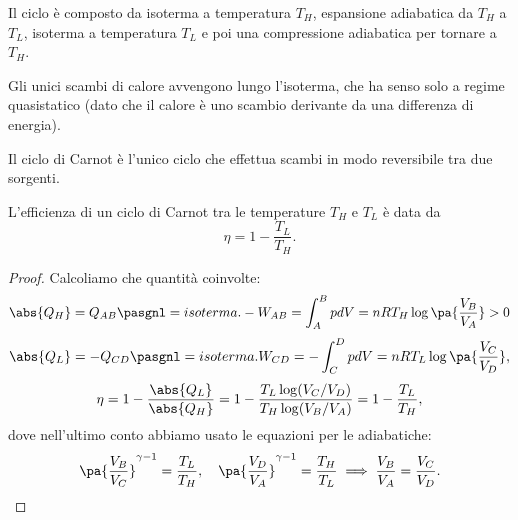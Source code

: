 \noindent
Il ciclo \`e composto da isoterma a temperatura $T_H$, espansione adiabatica da $T_H$ a $T_L$, isoterma a temperatura $T_L$ e poi una compressione adiabatica per tornare a $T_H$.

\begin{remark}
Gli unici scambi di calore avvengono lungo l'isoterma, che ha senso solo a regime quasistatico (dato che il calore \`e uno scambio derivante da una differenza di energia).
\end{remark}

\begin{fact}
Il ciclo di Carnot \`e l'unico ciclo che effettua scambi in modo reversibile tra due sorgenti.
\end{fact}




\begin{proposition}\label{EfficienzaCicloCarnot}
L'efficienza di un ciclo di Carnot tra le temperature $T_H$ e $T_L$ \`e data da
\[\eta=1-\frac{T_L}{T_H}.\]
\end{proposition}
\begin{proof}
Calcoliamo che quantit\`a coinvolte:
\[\abs{Q_H}=Q_{AB}\pasgnl={isoterma.}-W_{AB}=\int_A^BpdV=nRT_H\log\pa{\frac{V_B}{V_A}}>0\]
\[\abs{Q_L}=-Q_{CD}\pasgnl={isoterma.}W_{CD}=-\int_C^DpdV=nRT_L\log\pa{\frac{V_C}{V_D}},\]
\[\eta=1-\frac{\abs{Q_L}}{\abs{Q_H}}=1-\frac{T_L\log(V_C/V_D)}{T_H\log(V_B/V_A)}=1-\frac{T_L}{T_H},\]
dove nell'ultimo conto abbiamo usato le equazioni per le adiabatiche:
\[\pa{\frac{V_B}{V_C}}^{\gamma-1}=\frac{T_L}{T_H},\quad \pa{\frac{V_D}{V_A}}^{\gamma-1}=\frac{T_H}{T_L}\implies \frac{V_B}{V_A}=\frac{V_C}{V_D}.\]
\end{proof}

